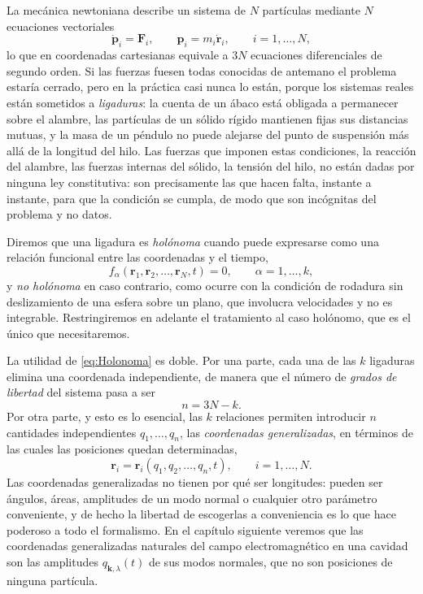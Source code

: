         La mecánica newtoniana describe un sistema de $N$ partículas mediante $N$ ecuaciones vectoriales
        \begin{equation}\label{eq:Newton}
            \dot{\mathbf{p}}_{i} = \mathbf{F}_{i}, \qquad \mathbf{p}_{i} = m_{i}\dot{\mathbf{r}}_{i}, \qquad i = 1,\ldots,N,
        \end{equation}
        lo que en coordenadas cartesianas equivale a $3N$ ecuaciones diferenciales de segundo orden. Si las fuerzas fuesen todas conocidas de antemano el problema estaría cerrado, pero en la práctica casi nunca lo están, porque los sistemas reales están sometidos a \textit{ligaduras}: la cuenta de un ábaco está obligada a permanecer sobre el alambre, las partículas de un sólido rígido mantienen fijas sus distancias mutuas, y la masa de un péndulo no puede alejarse del punto de suspensión más allá de la longitud del hilo. Las fuerzas que imponen estas condiciones, la reacción del alambre, las fuerzas internas del sólido, la tensión del hilo, no están dadas por ninguna ley constitutiva: son precisamente las que hacen falta, instante a instante, para que la condición se cumpla, de modo que son incógnitas del problema y no datos.

        Diremos que una ligadura es \textit{holónoma} cuando puede expresarse como una relación funcional entre las coordenadas y el tiempo,
        \begin{equation}\label{eq:Holonoma}
            f_{\alpha}(\mathbf{r}_{1},\mathbf{r}_{2},\ldots,\mathbf{r}_{N},t) = 0, \qquad \alpha = 1,\ldots,k,
        \end{equation}
        y \textit{no holónoma} en caso contrario, como ocurre con la condición de rodadura sin deslizamiento de una esfera sobre un plano, que involucra velocidades y no es integrable. Restringiremos en adelante el tratamiento al caso holónomo, que es el único que necesitaremos.

        La utilidad de \eqref{eq:Holonoma} es doble. Por una parte, cada una de las $k$ ligaduras elimina una coordenada independiente, de manera que el número de \textit{grados de libertad} del sistema pasa a ser
        \begin{equation}\label{eq:GradosLibertad}
            n = 3N - k .
        \end{equation}
        Por otra parte, y esto es lo esencial, las $k$ relaciones permiten introducir $n$ cantidades independientes $q_{1},\ldots,q_{n}$, las \textit{coordenadas generalizadas}, en términos de las cuales las posiciones quedan determinadas,
        \begin{equation}\label{eq:CoordGen}
            \mathbf{r}_{i} = \mathbf{r}_{i}(q_{1},q_{2},\ldots,q_{n},t), \qquad i = 1,\ldots,N .
        \end{equation}
        Las coordenadas generalizadas no tienen por qué ser longitudes: pueden ser ángulos, áreas, amplitudes de un modo normal o cualquier otro parámetro conveniente, y de hecho la libertad de escogerlas a conveniencia es lo que hace poderoso a todo el formalismo. En el capítulo siguiente veremos que las coordenadas generalizadas naturales del campo electromagnético en una cavidad son las amplitudes $q_{\mathbf{k},\lambda}(t)$ de sus modos normales, que no son posiciones de ninguna partícula.

